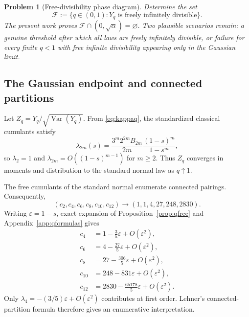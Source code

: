 \documentclass[11pt]{article}
\newtheorem{problem}[theorem]{Problem}
\theoremstyle{definition}
\newcommand{\Var}{\operatorname{Var}}
\begin{document}
\begin{problem}[Free-divisibility phase diagram]\label{prob:phase}
Determine the set
\[
\mathcal F:=\{q\in(0,1):Y_q\text{ is freely infinitely divisible}\}.
\]
The present work proves \(\mathcal F\cap(0,\sqrt\alpha)=\varnothing\). Two plausible scenarios remain: a genuine threshold after which all laws are freely infinitely divisible, or failure for every finite \(q<1\) with free infinite divisibility appearing only in the Gaussian limit.
\end{problem}

\subsection{The Gaussian endpoint and connected partitions}
Let \(Z_q=Y_q/\sqrt{\Var(Y_q)}\). From \eqref{eq:kappaq}, the standardized classical cumulants satisfy
\begin{equation}\label{eq:stdclassical}
\lambda_{2m}(s)=
\frac{3^m2^{2m}B_{2m}}{2m}\frac{(1-s)^m}{1-s^m},
\end{equation}
so \(\lambda_2=1\) and \(\lambda_{2m}=O((1-s)^{m-1})\) for \(m\ge2\). Thus \(Z_q\) converges in moments and distribution to the standard normal law as \(q\uparrow1\).

The free cumulants of the standard normal enumerate connected pairings. Consequently,
\begin{equation}\label{eq:normalfree}
(c_2,c_4,c_6,c_8,c_{10},c_{12})\longrightarrow(1,1,4,27,248,2830).
\end{equation}
Writing \(\varepsilon=1-s\), exact expansion of Proposition~\ref{prop:qfree} and Appendix~\ref{app:qformulas} gives
\begin{align}
c_4&=1-\frac35\varepsilon+O(\varepsilon^2),\nonumber\\
c_6&=4-\frac{27}{5}\varepsilon+O(\varepsilon^2),\nonumber\\
c_8&=27-\frac{306}{5}\varepsilon+O(\varepsilon^2),\label{eq:gausscorrections}\\
c_{10}&=248-831\varepsilon+O(\varepsilon^2),\nonumber\\
c_{12}&=2830-\frac{65178}{5}\varepsilon+O(\varepsilon^2).\nonumber
\end{align}
Only \(\lambda_4=-(3/5)\varepsilon+O(\varepsilon^2)\) contributes at first order. Lehner's connected-partition formula therefore gives an enumerative interpretation.
\end{document}
